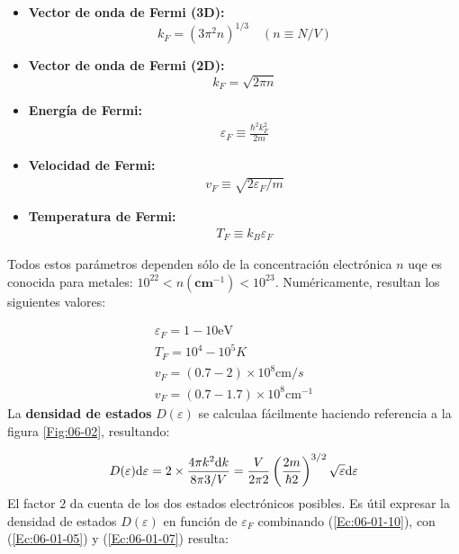 \begin{itemize}
	\item \textbf{Vector de onda de Fermi (3D):}
	\begin{equation}
		k_F = (3\pi^2 n)^{1/3} \quad (n\equiv N/V) \label{Ec:06-01-05}
	\end{equation}
	\item \textbf{Vector de onda de Fermi (2D):}
	\begin{equation}
		k_F= \sqrt{2\pi n}
	\end{equation}
	\item \textbf{Energía de Fermi:}
	\begin{eqnarray}
		\varepsilon_F \equiv \frac{\hbar^2 k_F^2}{2m} \label{Ec:06-01-07}
	\end{eqnarray}
	\item \textbf{Velocidad de Fermi:}
	\begin{eqnarray}
	v_F \equiv \sqrt{2\varepsilon_F /m}
	\end{eqnarray}
	\item \textbf{Temperatura de Fermi:}
	\begin{eqnarray}
		T_F \equiv k_B \varepsilon_F
	\end{eqnarray}
\end{itemize}
Todos estos parámetros dependen sólo de la concentración electrónica $n$ uqe es conocida para metales: $10^{22}<n(\textbf{cm}^{-1})<10^{23}$. Numéricamente, resultan los siguientes valores:

\begin{equation*}
	\begin{array}{c}
	\varepsilon_F = 1-10 \unit{\eV} \\
	T_F = 10^4 - 10^5 \unit{K} \\
	v_F = (0.7-2)\times 10^8 \unit{\cm/s}\\
	v_F = (0.7-1.7)\times 10^8 \unit{\cm^{-1}}
	\end{array}
\end{equation*}
La \textbf{densidad de estados} $D(\varepsilon)$ se calculaa fácilmente haciendo referencia a la figura \ref{Fig:06-02}, resultando:

\begin{equation}
	D(\varepsilon) \mathrm{d} \varepsilon = 2 \times \frac{4\pi k^2 \mathrm{d} k}{8 \pi3 /V} = \frac{V}{2\pi2} \left( \frac{2m}{\hbar2} \right)^{3/2} \sqrt{\varepsilon} \mathrm{d} \varepsilon \label{Ec:06-01-10}
\end{equation}
El factor $2$ da cuenta de los dos estados electrónicos posibles. Es útil expresar la densidad de estados $D(\varepsilon)$ en función de $\varepsilon_F$ combinando (\ref{Ec:06-01-10}), con (\ref{Ec:06-01-05}) y (\ref{Ec:06-01-07}) resulta:

